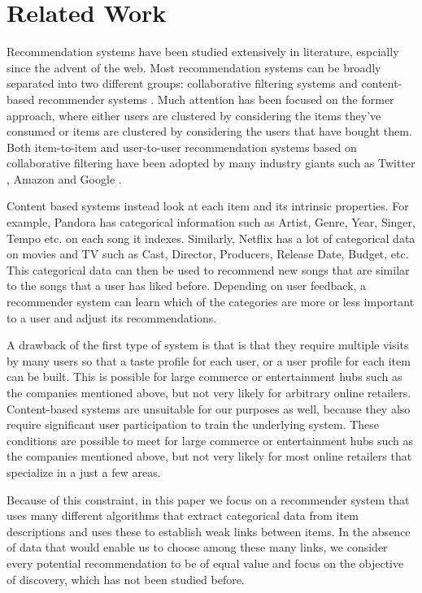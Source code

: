 \section{Related Work}

Recommendation systems have been studied extensively in literature, espcially since the advent of the web. Most recommendation systems can be broadly separated into two different groups: collaborative filtering systems and content-based recommender systems \cite{almazro2010survey}. Much attention has been focused on the former approach, where either users are clustered by considering the items they've consumed or items are clustered by considering the users that have bought them. Both item-to-item and user-to-user recommendation systems based on collaborative filtering have been adopted by many industry giants such as Twitter \cite{twitter-collab-filtering}, Amazon \cite{amazon-collab-filtering} and Google \cite{google-collab-filtering}.  \vs

Content based systems instead look at each item and its intrinsic properties. For example, Pandora has categorical information such as Artist, Genre, Year, Singer, Tempo etc. on each song it indexes. Similarly, Netflix has a lot of categorical data on movies and TV such as Cast, Director, Producers, Release Date, Budget, etc. This categorical data can then be used to recommend new songs that are similar to the songs that a user has liked before. Depending on user feedback, a recommender system can learn which of the categories are more or less important to a user and adjust its recommendations. \vs

A drawback of the first type of system is that is that they require multiple visits by many users so that a taste profile for each user, or a user profile for each item can be built. This is possible for large commerce or entertainment hubs such as the companies mentioned above, but not very likely for arbitrary online retailers. Content-based systems are unsuitable for our purposes as well, because they also require significant user participation to train the underlying system. These conditions are possible to meet for large commerce or entertainment hubs such as the companies mentioned above, but not very likely for most online retailers that specialize in a just a few areas. \vs

Because of this constraint, in this paper we focus on a recommender system that uses many different algorithms that extract categorical data from item descriptions and uses these to establish weak links between items. In the absence of data that would enable us to choose among these many links, we consider every potential recommendation to be of equal value and focus on the objective of discovery, which has not been studied before. \vs

